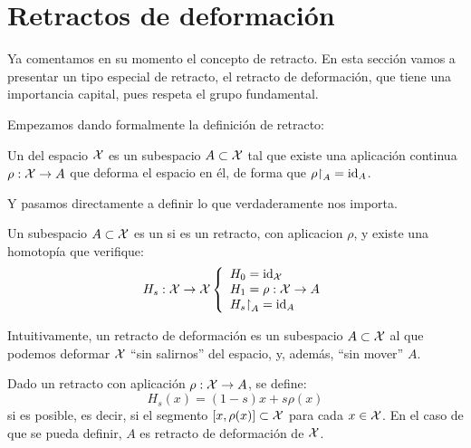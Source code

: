 \section{Retractos de deformación}

Ya comentamos en su momento el concepto de retracto. En esta sección vamos a presentar un tipo especial de retracto, el retracto de deformación, que tiene una importancia capital, pues respeta el grupo fundamental.

Empezamos dando formalmente la definición de retracto:

\begin{defi}[Retracto]
	Un  del espacio $\mathcal{X}$ es un subespacio $A\subset\mathcal{X}$ tal que existe una aplicación continua $\rho:\mathcal{X}\to A$ que deforma el espacio en él, de forma que $\rho\mathord{\upharpoonright}_A = \operatorname{\mathrm{id}}_A$.
\end{defi}

Y pasamos directamente a definir lo que verdaderamente nos importa.

\begin{defi}
	Un subespacio $A\subset\mathcal{X}$ es un  si es un retracto, con aplicacion $\rho$, y existe una homotopía que verifique:
	\[H_s:\mathcal{X}\to\mathcal{X}\left\{\begin{array}{l}
	H_0 = \operatorname{\mathrm{id}}_{\mathcal{X}} \\
	H_1 = \rho:\mathcal{X}\to A \\
	H_s\mathord{\upharpoonright}_A = \operatorname{\mathrm{id}}_A
	\end{array}\right. \]
\end{defi}

Intuitivamente, un retracto de deformación es un subespacio $A\subset\mathcal{X}$ al que podemos deformar $\mathcal{X}$ ``sin salirnos'' del espacio, y, además, ``sin mover'' $A$.

\begin{obs}
	\label{grf_obs_interpolacion_retractos}
	Dado un retracto con aplicación $\rho:\mathcal{X}\to A$, se define:
	\[H_s(x) = (1-s)x+s\rho(x)\]
	si es posible, es decir, si el segmento $[x,\rho(x)]\subset\mathcal{X}$ para cada $x\in\mathcal{X}$. En el caso de que se pueda definir, $A$ es retracto de deformación de $\mathcal{X}$.
\end{obs}

